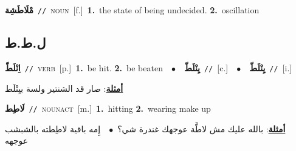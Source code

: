 \documentclass[10pt,a4paper,twoside]{article} %
\begin{document}
\begin{multicols}{2}
{\setlength\topsep{0pt}\textbf{\foreignlanguage{arabic}{مْلَاطَشِة}}\ {\color{gray}\texttt{//}\color{black}}\ \textsc{noun}\ [f.]\ \textbf{1.}~the state of being undecided.  \textbf{2.}~oscillation\ } \vspace{2mm}

\vspace{-3mm}
\subsection*{\color{blue}\foreignlanguage{arabic}{ل.ط.ط}\color{blue}{}} 

{\setlength\topsep{0pt}\textbf{\foreignlanguage{arabic}{اِنْلَطّ}}\ {\color{gray}\texttt{//}\color{black}}\ \textsc{verb}\ [p.]\ \textbf{1.}~be hit.  \textbf{2.}~be beaten\ \ $\bullet$\ \ \setlength\topsep{0pt}\textbf{\foreignlanguage{arabic}{يِنْلَطّ}}\ {\color{gray}\texttt{//}\color{black}}\ [c.]\ \ $\bullet$\ \ \setlength\topsep{0pt}\textbf{\foreignlanguage{arabic}{يِنْلَطّ}}\ {\color{gray}\texttt{//}\color{black}}\ [i.]\  \begin{flushright}\color{gray}\foreignlanguage{arabic}{\textbf{\underline{\foreignlanguage{arabic}{أمثلة}}}: صار قد الشنتير ولسة بيِنْلَط}\end{flushright}\color{black}} \vspace{2mm}

{\setlength\topsep{0pt}\textbf{\foreignlanguage{arabic}{لَاطِط}}\ {\color{gray}\texttt{//}\color{black}}\ \textsc{noun\textunderscore act}\ [m.]\ \textbf{1.}~hitting  \textbf{2.}~wearing make up\  \begin{flushright}\color{gray}\foreignlanguage{arabic}{\textbf{\underline{\foreignlanguage{arabic}{أمثلة}}}: بالله عليك مش لاطَّة عوجهك غندرة شي؟\ $\bullet$\ \  إِمه باقية لاطِطته بالشبشب عوجهه}\end{flushright}\color{black}} \vspace{2mm}


\end{multicols}
\end{document}
